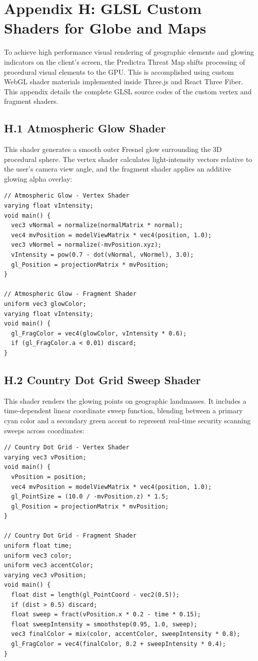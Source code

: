 \section*{Appendix H: GLSL Custom Shaders for Globe and Maps}
To achieve high performance visual rendering of geographic elements and glowing indicators on the client's screen, the Predictra Threat Map shifts processing of procedural visual elements to the GPU. This is accomplished using custom WebGL shader materials implemented inside Three.js and React Three Fiber. This appendix details the complete GLSL source codes of the custom vertex and fragment shaders.

\subsection*{H.1 Atmospheric Glow Shader}
This shader generates a smooth outer Fresnel glow surrounding the 3D procedural sphere. The vertex shader calculates light-intensity vectors relative to the user's camera view angle, and the fragment shader applies an additive glowing alpha overlay:
\begin{verbatim}
// Atmospheric Glow - Vertex Shader
varying float vIntensity;
void main() {
  vec3 vNormal = normalize(normalMatrix * normal);
  vec4 mvPosition = modelViewMatrix * vec4(position, 1.0);
  vec3 vNormel = normalize(-mvPosition.xyz);
  vIntensity = pow(0.7 - dot(vNormal, vNormel), 3.0);
  gl_Position = projectionMatrix * mvPosition;
}

// Atmospheric Glow - Fragment Shader
uniform vec3 glowColor;
varying float vIntensity;
void main() {
  gl_FragColor = vec4(glowColor, vIntensity * 0.6);
  if (gl_FragColor.a < 0.01) discard;
}
\end{verbatim}

\subsection*{H.2 Country Dot Grid Sweep Shader}
This shader renders the glowing points on geographic landmasses. It includes a time-dependent linear coordinate sweep function, blending between a primary cyan color and a secondary green accent to represent real-time security scanning sweeps across coordinates:
\begin{verbatim}
// Country Dot Grid - Vertex Shader
varying vec3 vPosition;
void main() {
  vPosition = position;
  vec4 mvPosition = modelViewMatrix * vec4(position, 1.0);
  gl_PointSize = (10.0 / -mvPosition.z) * 1.5;
  gl_Position = projectionMatrix * mvPosition;
}

// Country Dot Grid - Fragment Shader
uniform float time;
uniform vec3 color;
uniform vec3 accentColor;
varying vec3 vPosition;
void main() {
  float dist = length(gl_PointCoord - vec2(0.5));
  if (dist > 0.5) discard;
  float sweep = fract(vPosition.x * 0.2 - time * 0.15);
  float sweepIntensity = smoothstep(0.95, 1.0, sweep);
  vec3 finalColor = mix(color, accentColor, sweepIntensity * 0.8);
  gl_FragColor = vec4(finalColor, 0.2 + sweepIntensity * 0.4);
}
\end{verbatim}

